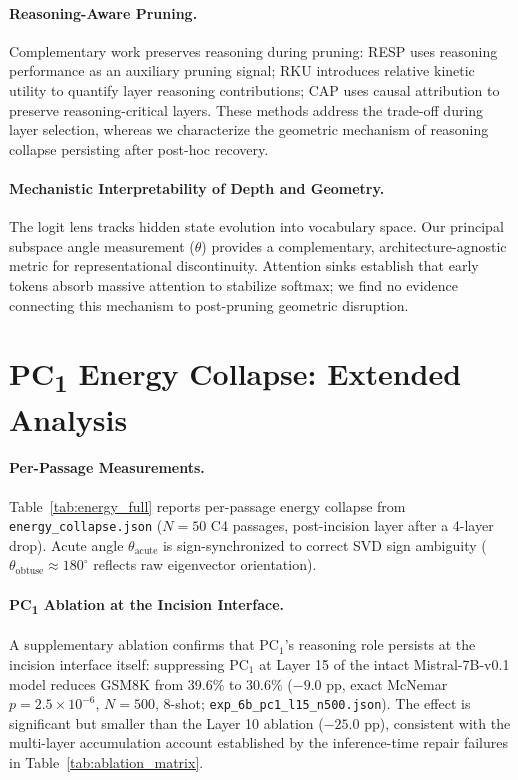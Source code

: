 \documentclass[pmlr,onecolumn]{jmlr}
\begin{document}
{\paragraph{Reasoning-Aware Pruning.}
Complementary work preserves reasoning during pruning: RESP \citep{wang2025resp} uses reasoning performance as an auxiliary pruning signal; RKU \citep{qian2026rku} introduces relative kinetic utility to quantify layer reasoning contributions; CAP \citep{sheth2026cap} uses causal attribution to preserve reasoning-critical layers. These methods address the trade-off during layer selection, whereas we characterize the geometric mechanism of reasoning collapse persisting after post-hoc recovery.

\paragraph{Mechanistic Interpretability of Depth and Geometry.}
The logit lens \citep{nostalgebraist2021lens} tracks hidden state evolution into vocabulary space. Our principal subspace angle measurement ($\theta$) provides a complementary, architecture-agnostic metric for representational discontinuity. Attention sinks \citep{xiao2023efficient} establish that early tokens absorb massive attention to stabilize softmax; we find no evidence connecting this mechanism to post-pruning geometric disruption.


\section{PC\textsubscript{1} Energy Collapse: Extended Analysis}
\label{app:energy}
\enlargethispage{1\baselineskip}

\paragraph{Per-Passage Measurements.}
Table~\ref{tab:energy_full} reports per-passage energy collapse from \texttt{energy\_collapse.json} ($N=50$ C4 passages, post-incision layer after a 4-layer drop). Acute angle $\theta_{\mathrm{acute}}$ is sign-synchronized to correct SVD sign ambiguity ($\theta_{\mathrm{obtuse}} \approx 180^\circ$ reflects raw eigenvector orientation).

\paragraph{PC\textsubscript{1} Ablation at the Incision Interface.}
A supplementary ablation confirms that $\mathrm{PC}_1$'s reasoning role persists at the incision interface itself: suppressing $\mathrm{PC}_1$ at Layer 15 of the intact Mistral-7B-v0.1 model reduces GSM8K from 39.6\% to 30.6\% ($-9.0$ pp, exact McNemar $p = 2.5\times10^{-6}$, $N=500$, 8-shot; \texttt{exp\_6b\_pc1\_l15\_n500.json}). The effect is significant but smaller than the Layer 10 ablation ($-25.0$ pp), consistent with the multi-layer accumulation account established by the inference-time repair failures in Table~\ref{tab:ablation_matrix}.

}
\end{document}
